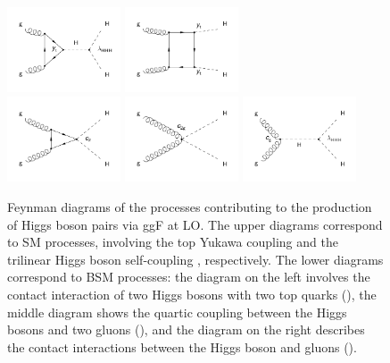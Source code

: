 \documentclass[11pt,a4paper,cmspaper,final,collab]{cms-tdr}
\begin{document}
\begin{figure}[hbt]
\centering
\includegraphics[width=0.3\textwidth]{Figure_001-a.pdf}
\includegraphics[width=0.3\textwidth]{Figure_001-b.pdf}\\
\includegraphics[width=0.3\textwidth]{Figure_001-c.pdf}
\includegraphics[width=0.3\textwidth]{Figure_001-d.pdf}
\includegraphics[width=0.3\textwidth]{Figure_001-e.pdf}\\
\caption{Feynman diagrams of the processes contributing to the production of Higgs boson pairs via ggF at LO. The upper diagrams correspond to SM processes, involving the top Yukawa coupling \yt and the trilinear Higgs boson self-coupling \lbdHHH, respectively. The lower diagrams correspond to BSM processes: the diagram on the left involves the contact interaction of two Higgs bosons with two top quarks (\ctwo), the middle diagram shows the quartic coupling between the Higgs bosons and two gluons (\cgg), and the diagram on the right describes the contact interactions between the Higgs boson and gluons (\cg).\label{fig:dia}}
\end{figure}
\end{document}
